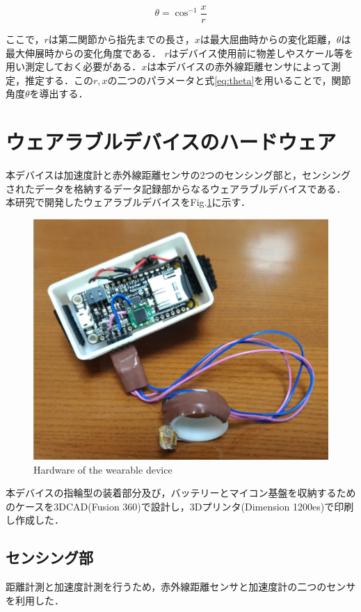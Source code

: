 \begin{equation}
\theta = \cos^{-1} \frac{x}{r}
\label{eq:theta}
\end{equation}


ここで，$r$は第二関節から指先までの長さ，$x$は最大屈曲時からの変化距離，$\theta$は最大伸展時からの変化角度である．
$r$はデバイス使用前に物差しやスケール等を用い測定しておく必要がある．$x$は本デバイスの赤外線距離センサによって測定，推定する．この$r,x$の二つのパラメータと式\ref{eq:theta}を用いることで，関節角度$\theta$を導出する．



\section{ウェアラブルデバイスのハードウェア}
本デバイスは加速度計と赤外線距離センサの2つのセンシング部と，センシングされたデータを格納するデータ記録部からなるウェアラブルデバイスである．
本研究で開発したウェアラブルデバイスをFig.\ref{fig:device}に示す．
\begin{figure}[H]
  \centering
  \includegraphics[width=0.8\linewidth]{fig/fal6}
  \caption{Hardware of the wearable device}
  \label{fig:device}
\end{figure}


本デバイスの指輪型の装着部分及び，バッテリーとマイコン基盤を収納するためのケースを3DCAD(Fusion 360)で設計し，3Dプリンタ(Dimension 1200es)で印刷し作成した．


\subsection*{センシング部}
距離計測と加速度計測を行うため，赤外線距離センサと加速度計の二つのセンサを利用した．
